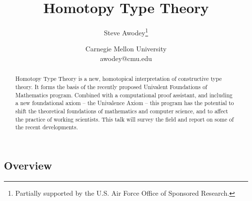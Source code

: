 \documentclass[11pt]{article}
\begin{document}



\newtheorem{theorem}{Theorem}
\newtheorem*{theorem*}{Theorem}
\newtheorem{proposition}[theorem]{Proposition} 
\newtheorem{lemma}[theorem]{Lemma}
\newtheorem{corollary}[theorem]{Corollary} 

\theoremstyle{remark}
\newtheorem{remark}[theorem]{Remark} 
\newtheorem*{remarks*}{Remarks}
\newtheorem{example}[theorem]{Example}

\theoremstyle{definition}
\newtheorem{definition}[theorem]{Definition}



\title{
Homotopy Type Theory
}
\author{
Steve Awodey\thanks{
Partially supported by the U.S. Air Force Office of Sponsored Research.
}
}
\date{
Carnegie Mellon University\\
awodey@cmu.edu
}

\maketitle

\begin{abstract}
Homotopy Type Theory is a new, homotopical interpretation of constructive type theory.  It forms the basis of the recently proposed Univalent Foundations of Mathematics program. Combined with a computational proof assistant, and including a new foundational axiom -- the Univalence Axiom -- this program has the potential to shift the theoretical foundations of mathematics and computer science, and to affect the practice of working scientists. This talk will survey the field and report on some of the recent developments.
\end{abstract}

\subsection*{Overview}
\end{document}
